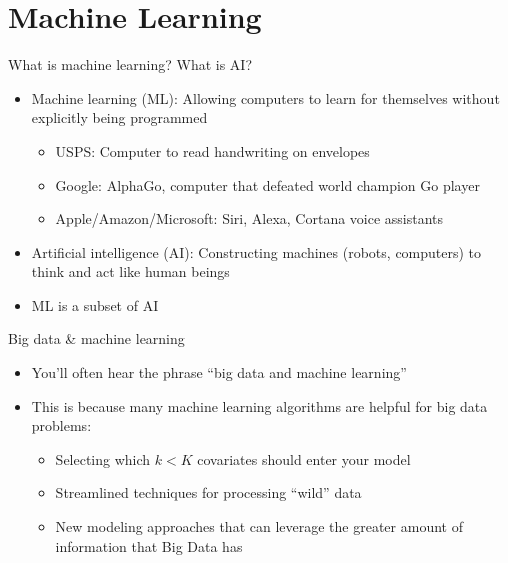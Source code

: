 \documentclass[english,aspectratio=169,12pt,xcolor=dvipsnames]{beamer}
\begin{document}
\section{Machine Learning}
\begin{frame}{What is machine learning? What is AI?}
\begin{itemize}
\item \alert{Machine learning (ML):} Allowing computers to learn for themselves without explicitly being programmed
    \begin{itemize}
    \item \alert{USPS:} Computer to read handwriting on envelopes
    \item \alert{Google:} AlphaGo, computer that defeated world champion Go player
    \item \alert{Apple/Amazon/Microsoft:} Siri, Alexa, Cortana voice assistants 
    \end{itemize}
\item \alert{Artificial intelligence (AI):} Constructing machines (robots, computers) to think and act like human beings
\item ML is a subset of AI
\end{itemize}
\end{frame}


\begin{frame}{Big data \& machine learning}
\begin{itemize}
\item You'll often hear the phrase ``big data and machine learning''
\item This is because many machine learning algorithms are helpful for big data problems:
    \begin{itemize}
    \item Selecting which $k<K$ covariates should enter your model
    \item Streamlined techniques for processing ``wild'' data
    \item New modeling approaches that can leverage the greater amount of information that Big Data has
    \end{itemize}
\end{itemize}
\end{frame}
\end{document}

